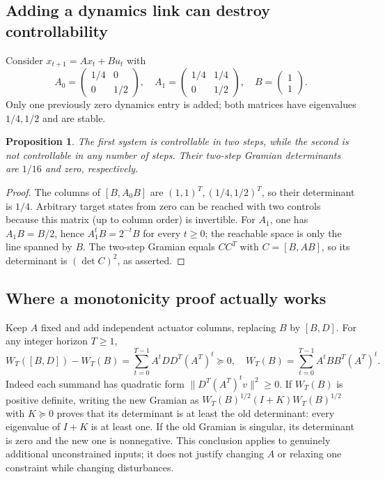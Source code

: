 \documentclass[11pt]{article}
\newtheorem{proposition}{Proposition}
\begin{document}
\subsection{Adding a dynamics link can destroy controllability}
Consider $x_{t+1}=Ax_t+Bu_t$ with
\[
 A_0=\begin{pmatrix}1/4&0\\0&1/2\end{pmatrix},\quad
 A_1=\begin{pmatrix}1/4&1/4\\0&1/2\end{pmatrix},\quad B=\begin{pmatrix}1\\1\end{pmatrix}.
\]
Only one previously zero dynamics entry is added; both matrices have eigenvalues $1/4,1/2$ and are stable.
\begin{proposition}
The first system is controllable in two steps, while the second is not controllable in any number of steps. Their two-step Gramian determinants are $1/16$ and zero, respectively.
\end{proposition}
\begin{proof}
The columns of $[B,A_0B]$ are $(1,1)^T,(1/4,1/2)^T$, so their determinant is $1/4$. Arbitrary target states from zero can be reached with two controls because this matrix (up to column order) is invertible. For $A_1$, one has $A_1B=B/2$, hence $A_1^tB=2^{-t}B$ for every $t\ge0$; the reachable space is only the line spanned by $B$. The two-step Gramian equals $CC^T$ with $C=[B,AB]$, so its determinant is $(\det C)^2$, as asserted.
\end{proof}
\subsection{Where a monotonicity proof actually works}
Keep $A$ fixed and add independent actuator columns, replacing $B$ by $[B,D]$. For any integer horizon $T\ge1$,
\[
 W_T([B,D])-W_T(B)=\sum_{t=0}^{T-1}A^tDD^T(A^T)^t\succeq0,
 \quad W_T(B)=\sum_{t=0}^{T-1}A^tBB^T(A^T)^t.
\]
Indeed each summand has quadratic form $\|D^T(A^T)^tv\|^2\ge0$. If $W_T(B)$ is positive definite, writing the new Gramian as $W_T(B)^{1/2}(I+K)W_T(B)^{1/2}$ with $K\succeq0$ proves that its determinant is at least the old determinant: every eigenvalue of $I+K$ is at least one. If the old Gramian is singular, its determinant is zero and the new one is nonnegative. This conclusion applies to genuinely additional unconstrained inputs; it does not justify changing $A$ or relaxing one constraint while changing disturbances.
\end{document}
